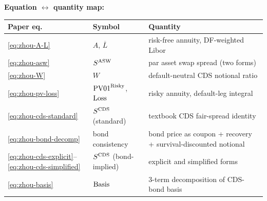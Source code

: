 \documentclass[11pt,a4paper]{article}
\begin{document}
\begin{validation}
\textbf{Equation $\leftrightarrow$ quantity map:}

\smallskip
\begin{tabular}{@{}p{2.8cm}p{3.8cm}p{6.2cm}@{}}
\toprule
Paper eq.                                    & Symbol                          & Quantity \\
\midrule
\eqref{eq:zhou-A-L}                          & $A$, $\overline L$              & risk-free annuity, DF-weighted Libor \\
\eqref{eq:zhou-asw}                          & $S^{\mathrm{ASW}}$                         & par asset swap spread (two forms) \\
\eqref{eq:zhou-W}                            & $W$                             & default-neutral CDS notional ratio \\
\eqref{eq:zhou-pv-loss}                      & $\mathrm{PV01}^{\text{Risky}}$, $\mathrm{Loss}$ & risky annuity, default-leg integral \\
\eqref{eq:zhou-cds-standard}                 & $S^{\mathrm{CDS}}$ (standard)              & textbook CDS fair-spread identity \\
\eqref{eq:zhou-bond-decomp}                  & bond consistency                & bond price as coupon + recovery + survival-discounted notional \\
\eqref{eq:zhou-cds-explicit}--\eqref{eq:zhou-cds-simplified} & $S^{\mathrm{CDS}}$ (bond-implied) & explicit and simplified forms \\
\eqref{eq:zhou-basis}                        & $\mathrm{Basis}$                        & 3-term decomposition of CDS-bond basis \\
\bottomrule
\end{tabular}
\smallskip


\end{validation}
\end{document}
